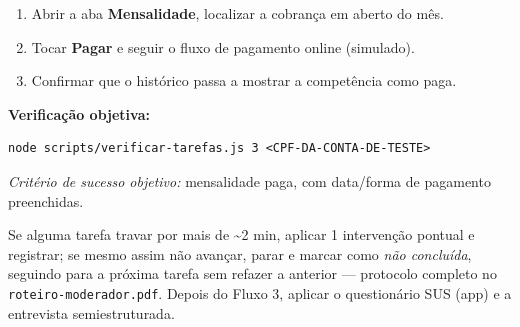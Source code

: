 \documentclass[11pt,a4paper]{article}
\newcommand{\criterio}[1]{%
  \noindent\textit{Critério de sucesso objetivo:} #1
}
\begin{document}
\begin{enumerate}[leftmargin=6mm]
  \item Abrir a aba \textbf{Mensalidade}, localizar a cobrança em aberto do mês.
  \item Tocar \textbf{Pagar} e seguir o fluxo de pagamento online (simulado).
  \item Confirmar que o histórico passa a mostrar a competência como paga.
\end{enumerate}

\textbf{Verificação objetiva:}
\begin{verbatim}
node scripts/verificar-tarefas.js 3 <CPF-DA-CONTA-DE-TESTE>
\end{verbatim}
\criterio{mensalidade paga, com data/forma de pagamento preenchidas.}

\vfill
\noindent\footnotesize Se alguma tarefa travar por mais de \textasciitilde2 min, aplicar 1
intervenção pontual e registrar; se mesmo assim não avançar, parar e marcar como \textit{não
concluída}, seguindo para a próxima tarefa sem refazer a anterior --- protocolo completo no
\texttt{roteiro-moderador.pdf}. Depois do Fluxo 3, aplicar o questionário SUS (app) e a entrevista
semiestruturada.
\end{document}
